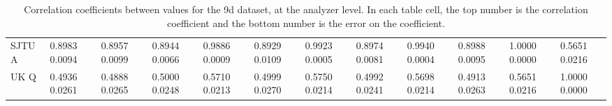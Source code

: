 \begin{landscape}
\begin{table}
\begin{tabularx}{1\linewidth}{@{\extracolsep{\fill}}lXXXXXXXXXXX}
	SJTU A & 0.8983 0.0094 & 0.8957 0.0099 & 0.8944 0.0066 & 0.9886 0.0009 & 0.8929 0.0109 & 0.9923 0.0005 & 0.8974 0.0081 & 0.9940 0.0004 & 0.8988 0.0095 & 1.0000 0.0000 & 0.5651 0.0216  \\
	UK Q   & 0.4936 0.0261 & 0.4888 0.0265 & 0.5000 0.0248 & 0.5710 0.0213 & 0.4999 0.0270 & 0.5750 0.0214 & 0.4992 0.0241 & 0.5698 0.0214 & 0.4913 0.0263 & 0.5651 0.0216 & 1.0000 0.0000  \\
  \bottomrule
\end{tabularx}
\caption[]{Correlation coefficients between \R values for the 9d dataset, at the analyzer level. In each table cell, the top number is the correlation coefficient and the bottom number is the error on the coefficient.}
\label{tab:Corrs_9d_analyzer}
\end{table}
\end{landscape}



